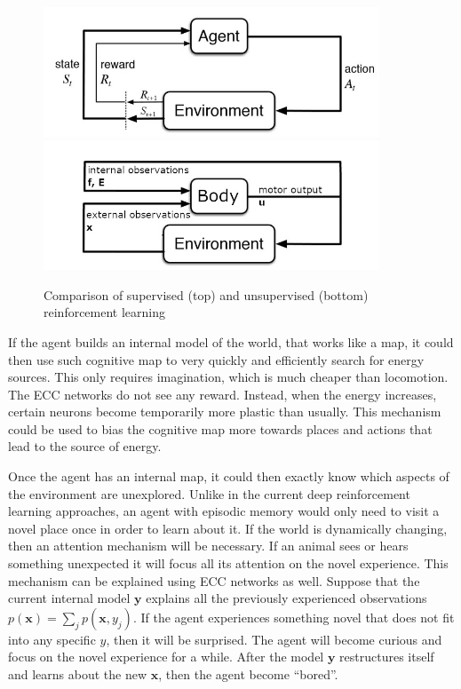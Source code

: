 \documentclass[12pt]{article}
\begin{document}
\begin{figure}[!htbp]
	\centering
	\includegraphics[width=10cm]{supervised reinforcement learning}
	\includegraphics[width=10cm]{unsupervised reinforcement learning}
	\caption{Comparison of supervised (top) and unsupervised (bottom) reinforcement learning}
	\label{fig:rl}
\end{figure} 

If the agent builds an internal model of the world, that works like a map, it could then use such cognitive map to very quickly and efficiently search for energy sources. This only requires imagination, which is much cheaper than locomotion. The ECC networks do not see any reward. Instead, when the energy increases, certain neurons become temporarily more plastic than usually. This mechanism could be used to bias the cognitive map more towards places and actions that lead to the source of energy.

Once the agent has an internal map, it could then exactly know which aspects of the environment are unexplored. Unlike in the current deep reinforcement learning approaches, an agent with episodic memory would only need to visit a novel place once in order to learn about it. If the world is dynamically changing, then an attention mechanism will be necessary. If an animal sees or hears something unexpected it will focus all its attention on the novel experience. This mechanism can be explained using ECC networks as well. Suppose that the current internal model $\boldsymbol{y}$ explains all the previously experienced observations $p(\boldsymbol{x})=\sum_j p(\boldsymbol{x},y_j)$. If the agent experiences something novel that does not fit into any specific $y$, then it will be surprised. The agent will become curious and focus on the novel experience for a while. After the model  $\boldsymbol{y}$ restructures itself and learns about the new $\boldsymbol{x}$, then the agent become ``bored''. 
\end{document}
